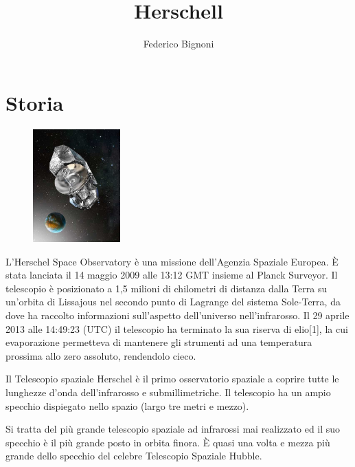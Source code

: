 \documentclass[12pt,a4paper]{article}
\begin{document}
\title{\vspace{-70pt}Herschell}
\author{Federico Bignoni}
\date{}
\maketitle
\pagestyle{empty}
\thispagestyle{empty}

\section*{Storia}
\label{storia}
\begin{figure}
  \vspace{-10pt}
  \begin{center}
    \includegraphics[width=0.30\textwidth]{satellite}
  \end{center}
  \vspace{-20pt}
\end{figure}
L'Herschel Space Observatory è una missione dell'Agenzia Spaziale Europea.
È stata lanciata il 14 maggio 2009 alle 13:12 GMT insieme al Planck Surveyor.
Il telescopio è posizionato a 1,5 milioni di chilometri di distanza dalla Terra su un'orbita di Lissajous nel secondo punto di Lagrange del sistema Sole-Terra, da dove ha raccolto informazioni sull'aspetto dell'universo nell'infrarosso. Il 29 aprile 2013 alle 14:49:23 (UTC) il telescopio ha terminato la sua riserva di elio[1], la cui evaporazione permetteva di mantenere gli strumenti ad una temperatura prossima allo zero assoluto, rendendolo cieco.

Il Telescopio spaziale Herschel è il primo osservatorio spaziale a coprire tutte le lunghezze d'onda dell'infrarosso e submillimetriche. Il telescopio ha un ampio specchio dispiegato nello spazio (largo tre metri e mezzo).

Si tratta del più grande telescopio spaziale ad infrarossi mai realizzato ed il suo specchio è il più grande posto in orbita finora. È quasi una volta e mezza più grande dello specchio del celebre Telescopio Spaziale Hubble.
\end{document}

